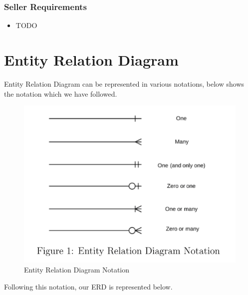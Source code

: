 \documentclass[a4paper,12pt]{article}
\begin{document}
\subsubsection{Seller Requirements}

\begin{itemize}
  \item TODO
\end{itemize}

\section{Entity Relation Diagram}
Entity Relation Diagram can be represented in various notations, below shows the notation which we have followed.


\begin{figure}[H]
    \centering
    \includegraphics[width=1\textwidth]{ERDNotation} 
    \caption{Entity Relation Diagram Notation}
\end{figure}

Following this notation, our ERD is represented below.
\end{document}
